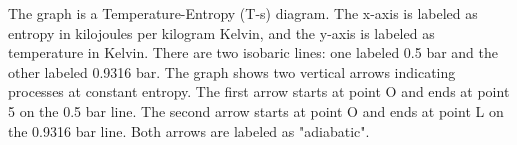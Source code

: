 The graph is a Temperature-Entropy (T-s) diagram. The x-axis is labeled as entropy in kilojoules per kilogram Kelvin, and the y-axis is labeled as temperature in Kelvin. There are two isobaric lines: one labeled 0.5 bar and the other labeled 0.9316 bar. The graph shows two vertical arrows indicating processes at constant entropy. The first arrow starts at point O and ends at point 5 on the 0.5 bar line. The second arrow starts at point O and ends at point L on the 0.9316 bar line. Both arrows are labeled as "adiabatic".